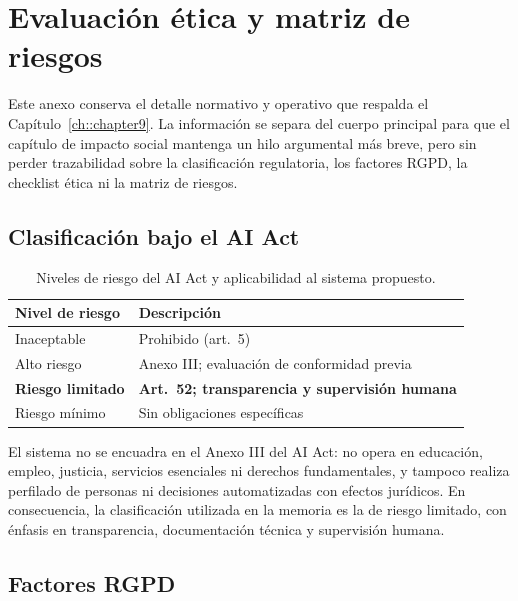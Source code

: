 %
\chapter{Evaluación ética y matriz de riesgos}
\label{ch::AnexoEtico}

Este anexo conserva el detalle normativo y operativo que respalda el
Capítulo~\ref{ch::chapter9}. La información se separa del cuerpo principal para que el
capítulo de impacto social mantenga un hilo argumental más breve, pero sin perder trazabilidad
sobre la clasificación regulatoria, los factores RGPD, la checklist ética ni la matriz de
riesgos.

\section{Clasificación bajo el AI Act}

\begin{table}[htbp]
\centering
\caption{Niveles de riesgo del AI Act y aplicabilidad al sistema propuesto.}
\label{tab:ch8_aiact_levels}
\begin{tabular}{p{}p{}}
\toprule
\textbf{Nivel de riesgo} & \textbf{Descripción} \\
\midrule
Inaceptable       & Prohibido (art.~5)                                               \\
Alto riesgo       & Anexo III; evaluación de conformidad previa                      \\
\textbf{Riesgo limitado} & \textbf{Art.~52; transparencia y supervisión humana}    \\
Riesgo mínimo     & Sin obligaciones específicas                                     \\
\bottomrule
\end{tabular}
\end{table}

El sistema no se encuadra en el Anexo III del AI Act: no opera en educación,
empleo, justicia, servicios esenciales ni derechos fundamentales, y tampoco realiza perfilado
de personas ni decisiones automatizadas con efectos jurídicos. En consecuencia, la clasificación
utilizada en la memoria es la de riesgo limitado, con énfasis en transparencia, documentación
técnica y supervisión humana.

\section{Factores RGPD}

